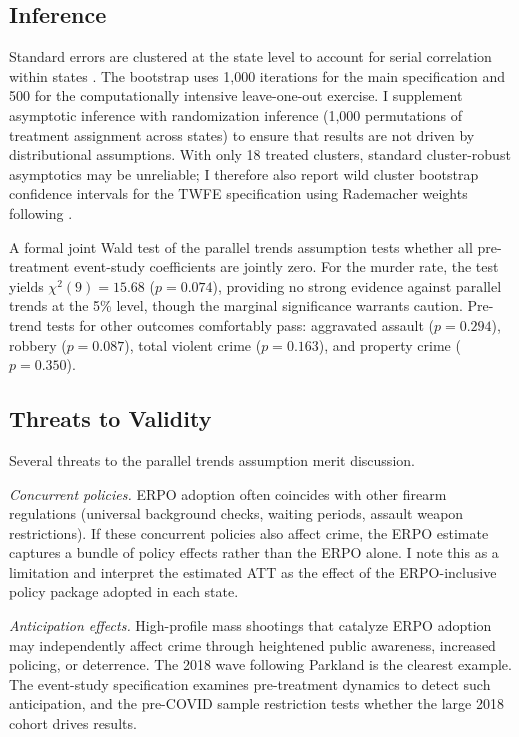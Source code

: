 \documentclass[12pt]{article}
\begin{document}
\subsection{Inference}

Standard errors are clustered at the state level to account for serial correlation within states \citep{callaway2021difference}. The bootstrap uses 1,000 iterations for the main specification and 500 for the computationally intensive leave-one-out exercise. I supplement asymptotic inference with randomization inference (1,000 permutations of treatment assignment across states) to ensure that results are not driven by distributional assumptions. With only 18 treated clusters, standard cluster-robust asymptotics may be unreliable; I therefore also report wild cluster bootstrap confidence intervals for the TWFE specification using Rademacher weights following \citet{cameron2008bootstrap}.

A formal joint Wald test of the parallel trends assumption tests whether all pre-treatment event-study coefficients are jointly zero. For the murder rate, the test yields $\chi^2(9) = 15.68$ ($p = 0.074$), providing no strong evidence against parallel trends at the 5\% level, though the marginal significance warrants caution. Pre-trend tests for other outcomes comfortably pass: aggravated assault ($p = 0.294$), robbery ($p = 0.087$), total violent crime ($p = 0.163$), and property crime ($p = 0.350$).

\subsection{Threats to Validity}

Several threats to the parallel trends assumption merit discussion.

\textit{Concurrent policies.} ERPO adoption often coincides with other firearm regulations (universal background checks, waiting periods, assault weapon restrictions). If these concurrent policies also affect crime, the ERPO estimate captures a bundle of policy effects rather than the ERPO alone. I note this as a limitation and interpret the estimated ATT as the effect of the ERPO-inclusive policy package adopted in each state.

\textit{Anticipation effects.} High-profile mass shootings that catalyze ERPO adoption may independently affect crime through heightened public awareness, increased policing, or deterrence. The 2018 wave following Parkland is the clearest example. The event-study specification examines pre-treatment dynamics to detect such anticipation, and the pre-COVID sample restriction tests whether the large 2018 cohort drives results.
\end{document}
